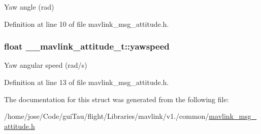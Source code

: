 Yaw angle (rad) 



Definition at line 10 of file mavlink\-\_\-msg\-\_\-attitude.\-h.

\hypertarget{struct____mavlink__attitude__t_a2a6cd5ab90b6c939dec690ebf7000101}{
\subsubsection[{yawspeed}]{\setlength{\rightskip}{0pt plus 5cm}float \-\_\-\-\_\-mavlink\-\_\-attitude\-\_\-t\-::yawspeed}}\label{struct____mavlink__attitude__t_a2a6cd5ab90b6c939dec690ebf7000101}


Yaw angular speed (rad/s) 



Definition at line 13 of file mavlink\-\_\-msg\-\_\-attitude.\-h.



The documentation for this struct was generated from the following file\-:\begin{DoxyCompactItemize}
\item 
/home/jose/\-Code/gui\-Tau/flight/\-Libraries/mavlink/v1./common/\hyperlink{mavlink__msg__attitude_8h}{mavlink\-\_\-msg\-\_\-attitude.\-h}\end{DoxyCompactItemize}
